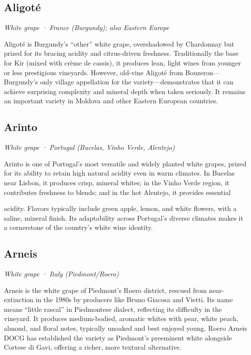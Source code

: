 \subsection*{Aligoté}
\textit{White grape · France (Burgundy); also Eastern Europe}\par\smallskip

Aligoté is Burgundy’s “other” white grape, overshadowed by Chardonnay but prized for its bracing acidity and citrus-driven freshness. Traditionally the base for Kir (mixed with crème de cassis), it produces lean, light wines from younger or less prestigious vineyards. However, old-vine Aligoté from Bouzeron— Burgundy’s only village appellation for the variety—demonstrates that it can achieve surprising complexity and mineral depth when taken seriously. It remains an important variety in Moldova and other Eastern European countries.

\subsection*{Arinto}
\textit{White grape · Portugal (Bucelas, Vinho Verde, Alentejo)}\par\smallskip

Arinto is one of Portugal’s most versatile and widely planted white grapes, prized for its ability to retain high natural acidity even in warm climates. In Bucelas near Lisbon, it produces crisp, mineral whites; in the Vinho Verde region, it contributes freshness to blends; and in the hot Alentejo, it provides essential

acidity. Flavors typically include green apple, lemon, and white flowers, with a saline, mineral finish. Its adaptability across Portugal’s diverse climates makes it a cornerstone of the country’s white wine identity.

\subsection*{Arneis}
\textit{White grape · Italy (Piedmont/Roero)}\par\smallskip

Arneis is the white grape of Piedmont’s Roero district, rescued from near-extinction in the 1980s by producers like Bruno Giacosa and Vietti. Its name means “little rascal” in Piedmontese dialect, reflecting its difficulty in the vineyard. It produces medium-bodied, aromatic whites with pear, white peach, almond, and floral notes, typically unoaked and best enjoyed young. Roero Arneis DOCG has established the variety as Piedmont’s preeminent white alongside Cortese di Gavi, offering a richer, more textural alternative.

